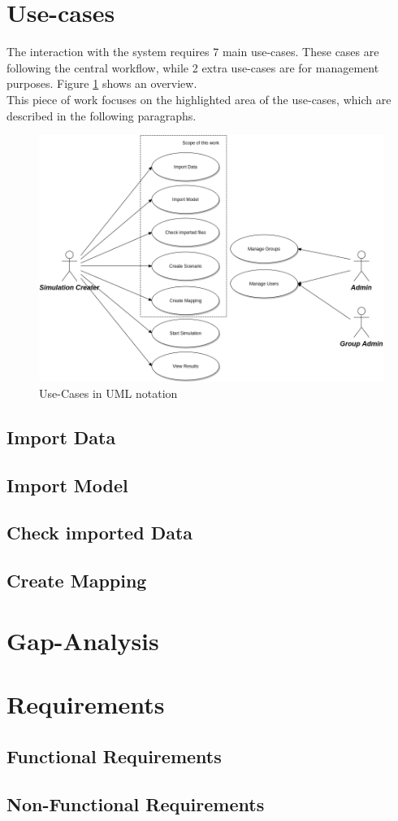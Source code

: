 \section{Use-cases}
The interaction with the system requires 7 main use-cases. These cases are following the central workflow, while 2 extra use-cases are for management purposes. Figure \ref{fig:use-cases} shows an overview.\\
This piece of work focuses on the highlighted area of the use-cases, which are described in the following paragraphs.
\begin{figure}[H]
	\centering\includegraphics[width=1\textwidth]{res/Use-Cases}
	\caption{Use-Cases in UML notation}
	\label{fig:use-cases}
\end{figure}

\subsection{Import Data}

\subsection{Import Model}

\subsection{Check imported Data}

\subsection{Create Mapping}



\section{Gap-Analysis}


\section{Requirements}

\subsection{Functional Requirements}

\subsection{Non-Functional Requirements}
